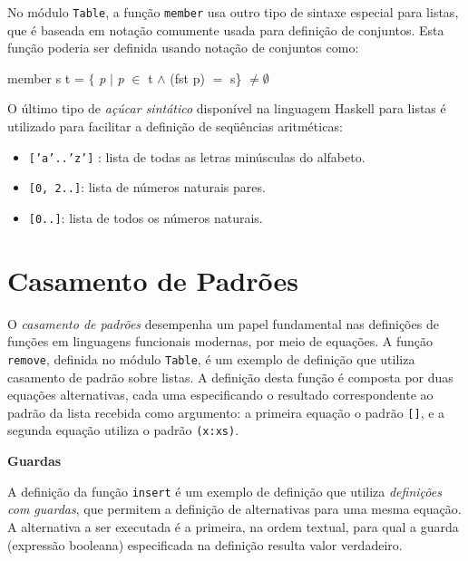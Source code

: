No m\'odulo \texttt{Table}, a fun\c{c}\~ao \texttt{member} usa outro tipo de
sintaxe especial para listas, que \'e baseada em nota\c{c}\~ao comumente usada para defini\c{c}\~ao de conjuntos.
Esta fun\c{c}\~ao poderia ser definida usando nota\c{c}\~ao de conjuntos como:
\begin{flushleft}
   member s t = $\{$ \emph{p} $|$ \emph{p} $\in$ t $\land$ (fst p) $=$ s\} $\neq \emptyset$\\   
\end{flushleft}

O \'ultimo tipo de \emph{a\c{c}\'ucar sint\'atico} dispon\'ivel na linguagem
Haskell para listas \'e utilizado para facilitar a defini\c{c}\~ao de
seq\"u\^encias aritm\'eticas:

\begin{itemize}
   \item{\texttt {['a'..'z']} : lista de todas as letras min\'usculas do
   alfabeto.}
   \item{\texttt {[0, 2..]}: lista de n\'umeros naturais pares.}
   \item{\texttt{[0..]}: lista de todos os n\'umeros naturais.}
\end{itemize}


\section{Casamento de Padr\~oes}


O \textit{casamento de padr\~oes} desempenha um papel fundamental nas defini\c{c}\~oes de
fun\c{c}\~oes em linguagens funcionais modernas, por meio de equa\c{c}\~oes. A
fun\c{c}\~ao \texttt{re\-mo\-ve}, definida no m\'odulo \texttt{Table},
\'e um exemplo de defini\c{c}\~ao que utiliza casamento de padr\~ao sobre
listas. A defini\c{c}\~ao desta fun\c{c}\~ao \'e composta por duas
equa\c{c}\~oes alternativas, cada uma especificando o resultado correspondente ao padr\~ao da lista recebida como
argumento: a primeira equa\c{c}\~ao o padr\~ao \texttt{[]}, e a segunda equa\c{c}\~ao utiliza o padr\~ao
\texttt{(x:xs)}.


\begin{flushleft}
   {\Large \textbf{Guardas}}
\end{flushleft}

A defini\c{c}\~ao da fun\c{c}\~ao \texttt{insert} \'e um exemplo de
defini\c{c}\~ao que utiliza \emph{defini\c{c}\~oes com guardas}, que permitem a
defini\c{c}\~ao de alternativas para uma mesma equa\c{c}\~ao. A alternativa a
ser executada \'e a primeira, na ordem textual, para qual a guarda (express\~ao booleana) 
especificada na defini\c{c}\~ao resulta valor verdadeiro.



